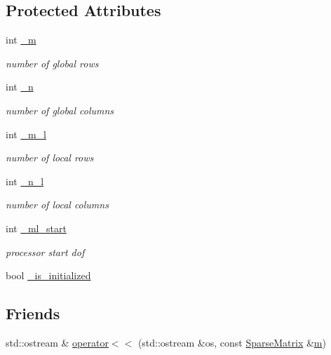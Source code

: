 \subsection*{Protected Attributes}
\begin{DoxyCompactItemize}
\item 
int \mbox{\hyperlink{classfemus_1_1_sparse_matrix_a4b7b41c2a2bd835b3261df9af8a8f033}{\+\_\+m}}
\begin{DoxyCompactList}\small\item\em number of global rows \end{DoxyCompactList}\item 
int \mbox{\hyperlink{classfemus_1_1_sparse_matrix_a4694b755be210277df88e61e8ae05ca6}{\+\_\+n}}
\begin{DoxyCompactList}\small\item\em number of global columns \end{DoxyCompactList}\item 
int \mbox{\hyperlink{classfemus_1_1_sparse_matrix_adc6670363425a5c7194cec61f14fe46b}{\+\_\+m\+\_\+l}}
\begin{DoxyCompactList}\small\item\em number of local rows \end{DoxyCompactList}\item 
int \mbox{\hyperlink{classfemus_1_1_sparse_matrix_af104c9620fa840f3f125104be3b84065}{\+\_\+n\+\_\+l}}
\begin{DoxyCompactList}\small\item\em number of local columns \end{DoxyCompactList}\item 
int \mbox{\hyperlink{classfemus_1_1_sparse_matrix_a75df17b47c03d198abd561d4a7aa9780}{\+\_\+ml\+\_\+start}}
\begin{DoxyCompactList}\small\item\em processor start dof \end{DoxyCompactList}\item 
bool \mbox{\hyperlink{classfemus_1_1_sparse_matrix_a948fb0d5a46d57bcc329383e787f6977}{\+\_\+is\+\_\+initialized}}
\end{DoxyCompactItemize}
\subsection*{Friends}
\begin{DoxyCompactItemize}
\item 
std\+::ostream \& \mbox{\hyperlink{classfemus_1_1_sparse_matrix_a9609c062064d21c2cb7073d8ec1f92a9}{operator$<$$<$}} (std\+::ostream \&os, const \mbox{\hyperlink{classfemus_1_1_sparse_matrix}{Sparse\+Matrix}} \&\mbox{\hyperlink{classfemus_1_1_sparse_matrix_a5f38aba83ed856290810a321a28480a7}{m}})
\end{DoxyCompactItemize}


